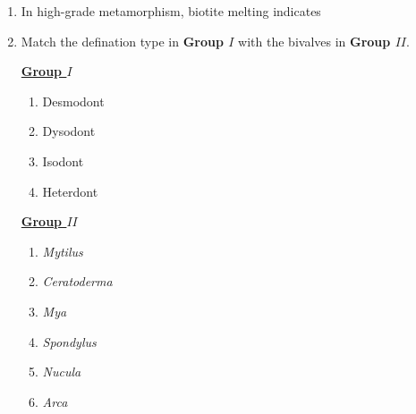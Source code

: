 \documentclass[journal,12pt,onecolumn]{IEEEtran}
\theoremstyle{remark}
\begin{document}
\begin{enumerate}
        \item In high-grade metamorphism, biotite melting indicates \hfill{}
            \begin{enumerate}
            \end{enumerate}

        \item Match the defination type in \textbf{Group $I$} with the bivalves in \textbf{Group $II$}.\hfill{}

        \begin{multicols}{2}
            \underline{\textbf{Group $I$}}
            \begin{enumerate}[start =16]
                \item Desmodont
                \item Dysodont
                \item Isodont
                \item Heterdont
            \end{enumerate}

            \columnbreak

            \underline{\textbf{Group $II$}}
            \begin{enumerate}
                \item \textit{Mytilus}
                \item \textit{Ceratoderma}
                \item \textit{Mya}
                \item \textit{Spondylus}
                \item \textit{Nucula}
                \item \textit{Arca}
            \end{enumerate}
        \end{multicols}

        \begin{enumerate}
        \end{enumerate}


\end{enumerate}
\end{document}
